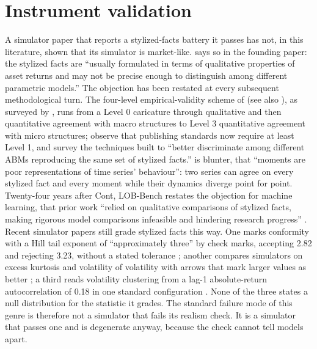 \section{Instrument validation}\label{sec:validation}

A simulator paper that reports a stylized-facts battery it passes has not, in this literature, shown that its simulator is market-like.  says so in the founding paper: the stylized facts are ``usually formulated in terms of qualitative properties of asset returns and may not be precise enough to distinguish among different parametric models.'' The objection has been restated at every subsequent methodological turn. The four-level empirical-validity scheme of \citet{axtell1994agent} (see also \citealp{barde2017empirical}), as surveyed by \citet{fagiolo2019validation}, runs from a Level 0 caricature through qualitative and then quantitative agreement with macro structures to Level 3 quantitative agreement with micro structures; \citet{fagiolo2019validation} observe that publishing standards now require at least Level 1, and survey the techniques built to ``better discriminate among different ABMs reproducing the same set of stylized facts.''  is blunter, that ``moments are poor representations of time series' behaviour'': two series can agree on every stylized fact and every moment while their dynamics diverge point for point. Twenty-four years after Cont, LOB-Bench restates the objection for machine learning, that prior work ``relied on qualitative comparisons of stylized facts, making rigorous model comparisons infeasible and hindering research progress'' \citep{nagy2025lobbench}. Recent simulator papers still grade stylized facts this way. One marks conformity with a Hill tail exponent of ``approximately three'' by check marks, accepting 2.82 and rejecting 3.23, without a stated tolerance \citep[pp.~15, 22]{hashimoto2026ecosystem}; another compares simulators on excess kurtosis and volatility of volatility with arrows that mark larger values as better \citep[p.~10]{zou2026finevo}; a third reads volatility clustering from a lag-1 absolute-return autocorrelation of 0.18 in one standard configuration \citep[p.~11]{jayakody2026kineticsim}. None of the three states a null distribution for the statistic it grades. The standard failure mode of this genre is therefore not a simulator that fails its realism check. It is a simulator that passes one and is degenerate anyway, because the check cannot tell models apart.

